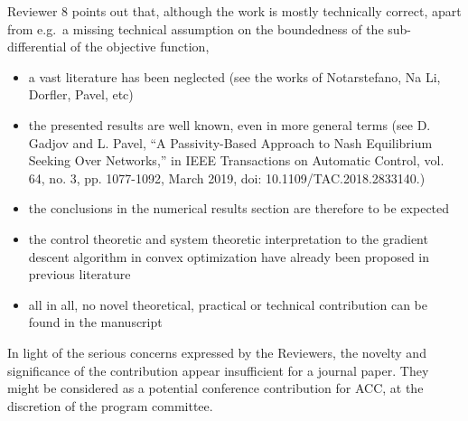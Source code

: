 Reviewer 8 points out that, although the work is mostly technically correct, apart from e.g.\ a missing technical assumption on the boundedness of the sub-differential of the objective function,
\vspace{-7pt}
\begin{itemize}[nosep]
    \item {%
        a vast literature has been neglected (see the works of Notarstefano, Na Li, Dorfler, Pavel, etc)
    }%
    \item{%
        the presented results are well known, even in more general terms (see D. Gadjov and L. Pavel, ``A Passivity-Based Approach to Nash Equilibrium Seeking Over Networks,'' in IEEE Transactions on Automatic Control, vol. 64, no. 3, pp. 1077-1092, March 2019, doi: 10.1109/TAC.2018.2833140.)
    }%
    \item{%
        the conclusions in the numerical results section are therefore to be expected
    }%
    \item{%
        the control theoretic and system theoretic interpretation to the gradient descent algorithm in convex optimization have already been proposed in previous literature
    }%
    \item{%
        all in all, no novel theoretical, practical or technical contribution can be found in the manuscript
    }%
\end{itemize}

In light of the serious concerns expressed by the Reviewers, the novelty and significance of the contribution appear insufficient for a journal paper. They might be considered as a potential conference contribution for ACC, at the discretion of the program committee.
\newpage
